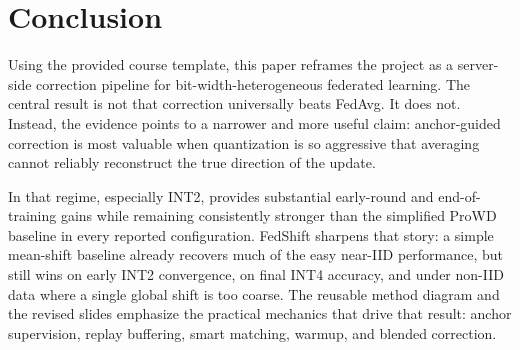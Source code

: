\section{Conclusion}

Using the provided course template, this paper reframes the project as a
server-side correction pipeline for bit-width-heterogeneous federated learning.
The central result is not that correction universally beats FedAvg. It does not.
Instead, the evidence points to a narrower and more useful claim: anchor-guided
correction is most valuable when quantization is so aggressive that averaging
cannot reliably reconstruct the true direction of the update.

In that regime, especially INT2, \method provides substantial early-round and
end-of-training gains while remaining consistently stronger than the simplified
ProWD baseline in every reported configuration. FedShift sharpens that story:
a simple mean-shift baseline already recovers much of the easy near-IID
performance, but \method still wins on early INT2 convergence, on final INT4
accuracy, and under non-IID data where a single global shift is too coarse.
The reusable method diagram and the revised slides emphasize the practical
mechanics that drive that result: anchor supervision, replay buffering, smart
matching, warmup, and blended correction.
